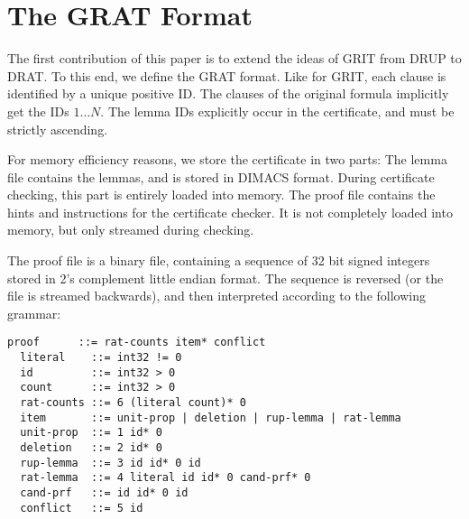 \documentclass{llncs}
\begin{document}
\section{The GRAT Format}\label{sec:grat-format}
The first contribution of this paper is to extend the ideas of GRIT from DRUP to DRAT.
To this end, we define the GRAT format. 
Like for GRIT, each clause is identified by a unique positive ID. 
The clauses of the original formula implicitly get the IDs $1\ldots N$. The lemma IDs explicitly occur in the certificate, and must be strictly ascending.

For memory efficiency reasons, we store the certificate in two parts: The lemma file contains the lemmas, and is stored in DIMACS format.
During certificate checking, this part is entirely loaded into memory.
The proof file contains the hints and instructions for the certificate checker. It is not completely loaded into memory, but only streamed during checking.

The proof file is a binary file, containing a sequence of 32 bit signed integers stored in 2's complement little endian format. 
The sequence is reversed (or the file is streamed backwards), and then interpreted according to the following grammar:
\begin{lstlisting}[language={},columns={[c]fullflexible},literate={}]
  proof      ::= rat-counts item* conflict
  literal    ::= int32 != 0
  id         ::= int32 > 0
  count      ::= int32 > 0
  rat-counts ::= 6 (literal count)* 0
  item       ::= unit-prop | deletion | rup-lemma | rat-lemma
  unit-prop  ::= 1 id* 0
  deletion   ::= 2 id* 0
  rup-lemma  ::= 3 id id* 0 id
  rat-lemma  ::= 4 literal id id* 0 cand-prf* 0
  cand-prf   ::= id id* 0 id
  conflict   ::= 5 id
\end{lstlisting}
\end{document}
